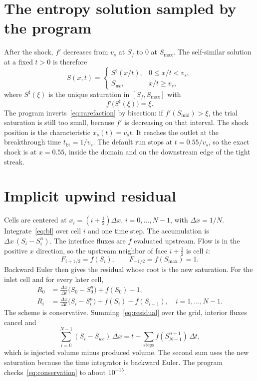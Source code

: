 \documentclass[11pt]{article}
\begin{document}
\section{The entropy solution sampled by the program}

After the shock, $f'$ decreases from $v_s$ at $S_f$ to $0$ at $S_{\max}$.
The self-similar solution at a fixed $t>0$ is therefore
\begin{equation}
\label{eq:exact}
S(x,t) =
\begin{cases}
S^{\sharp}(x/t), & 0 \le x/t < v_s,\\
S_{wc}, & x/t \ge v_s,
\end{cases}
\end{equation}
where $S^{\sharp}(\xi)$ is the unique saturation in $[S_f, S_{\max}]$ with
\begin{equation}
\label{eq:rarefaction}
f'\bigl(S^{\sharp}(\xi)\bigr) = \xi.
\end{equation}
The program inverts~\eqref{eq:rarefaction} by bisection: if $f'(S_{\mathrm{mid}}) > \xi$, the trial saturation is still too small, because $f'$ is decreasing on that interval.
The shock position is the characteristic $x_s(t) = v_s t$.
It reaches the outlet at the breakthrough time $t_{\mathrm{bt}} = 1/v_s$.
The default run stops at $t = 0.55/v_s$, so the exact shock is at $x = 0.55$, inside the domain and on the downstream edge of the tight streak.

\section{Implicit upwind residual}

Cells are centered at $x_i = (i+\tfrac12)\Delta x$, $i = 0,\ldots,N-1$, with $\Delta x = 1/N$.
Integrate~\eqref{eq:bl} over cell $i$ and one time step.
The accumulation is $\Delta x\,(S_i - S_i^n)$.
The interface fluxes are $f$ evaluated upstream.
Flow is in the positive $x$ direction, so the upstream neighbor of face $i+\tfrac12$ is cell $i$:
\begin{equation}
\label{eq:flux}
F_{i+1/2} = f(S_i),
\qquad
F_{-1/2} = f(S_{\max}) = 1.
\end{equation}
Backward Euler then gives the residual whose root is the new saturation.
For the inlet cell and for every later cell,
\begin{equation}
\label{eq:residual}
\begin{aligned}
R_0 &= \frac{\Delta x}{\Delta t}\bigl(S_0 - S_0^n\bigr) + f(S_0) - 1,\\
R_i &= \frac{\Delta x}{\Delta t}\bigl(S_i - S_i^n\bigr) + f(S_i) - f(S_{i-1}),
\quad i = 1,\ldots,N-1.
\end{aligned}
\end{equation}
The scheme is conservative.
Summing~\eqref{eq:residual} over the grid, interior fluxes cancel and
\begin{equation}
\label{eq:conservation}
\sum_{i=0}^{N-1}(S_i - S_{wc})\,\Delta x
=
t - \sum_{\mathrm{steps}} f(S_{N-1}^{n+1})\,\Delta t,
\end{equation}
which is injected volume minus produced volume.
The second sum uses the new saturation because the time integrator is backward Euler.
The program checks~\eqref{eq:conservation} to about $10^{-15}$.
\end{document}
